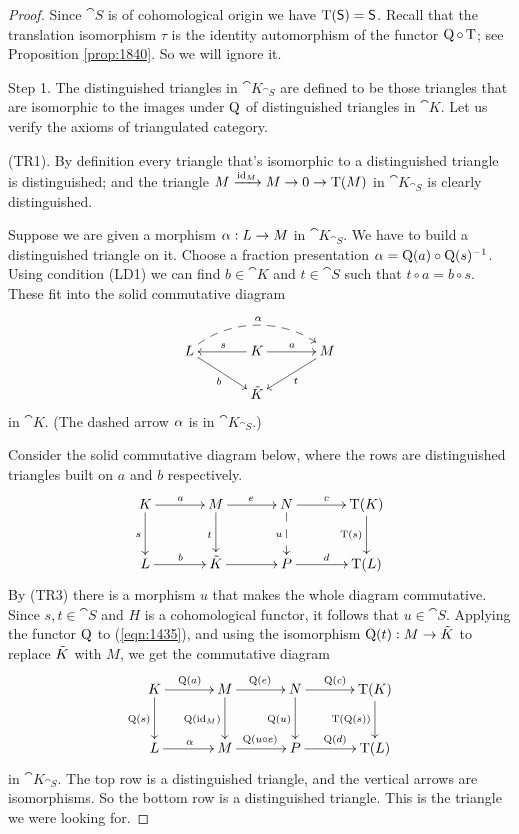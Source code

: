 \begin{proof} 
Since $\cat{S}$ is of cohomological origin we have 
$\operatorname{T}(\operatorname{\mathsf{S}}) = \operatorname{\mathsf{S}}$. Recall that the translation isomorphism $\tau$ is 
the identity automorphism of the functor $\operatorname{Q} \circ \operatorname{T}$; see 
Proposition \ref{prop:1840}. So we will ignore it. 

\medskip \noindent
Step 1.
The distinguished triangles in $\cat{K}_{\cat{S}}$ are defined to be those
triangles that are isomorphic to the images under $\operatorname{Q}$ of distinguished 
triangles in $\cat{K}$. Let us verify the axioms of triangulated 
category. 

\medskip \noindent
(TR1). By definition every triangle that's isomorphic to a distinguished 
triangle is distinguished; and the triangle 
$M \xrightarrow{\operatorname{id}_M} M \to 0 \to \operatorname{T}(M)$ 
in $\cat{K}_{\cat{S}}$ is clearly distinguished.

Suppose we are given a morphism $\alpha : L \to M$ in $\cat{K}_{\cat{S}}$. We have 
to build a distinguished triangle on it. 
Choose a fraction presentation 
$\alpha = \operatorname{Q}(a) \circ \operatorname{Q}(s)^{-1}$.
Using condition (LD1) we can find $b \in \cat{K}$ and $t \in 
\cat{S}$ such that $t \circ a = b \circ s$.
These fit into the solid commutative diagram
\[ \UseTips  \xymatrix @C=8ex @R=4ex { 
L
\ar@(ur,ul)@{-->}[rr]^{\al}
\ar[dr]_{b}
&
K
\ar[l]_{s}
\ar[r]^{a}
&
M
\ar[dl]^{t}
\\
&
\til{K}
}  \]
in $\cat{K}$. (The dashed arrow $\alpha$ is in $\cat{K}_{\cat{S}}$.) 

Consider the solid commutative diagram below, where
the rows are  distinguished triangles  built on $a$  and $b$ respectively.
\begin{equation} \label{eqn:1435}
 \UseTips  \xymatrix @C=8ex @R=6ex { 
K
\ar[r]^{a}
\ar[d]_{s}
&
M
\ar[r]^{e}
\ar[d]_{t}
& 
N
\ar[r]^{c}
\ar@{-->}[d]_{u}
&
\opn{T}(K)
\ar[d]_{\opn{T}(s)}
\\
L
\ar[r]^{b}
&
\til{K}
\ar[r]^{}
& 
P
\ar[r]^{d}
&
\opn{T}(L)
} 
\end{equation}
By (TR3) there is a morphism $u$ that makes the whole diagram commutative.
Since $s, t \in \cat{S}$ and $H$ is a cohomological functor, it follows that 
$u \in \cat{S}$. 
Applying the functor $\operatorname{Q}$ to (\ref{eqn:1435}), and using the 
isomorphism 
$\operatorname{Q}(t) : M \to \tilde{K}$ 
to replace $\tilde{K}$ with $M$,  we get the commutative diagram
\[ \UseTips  \xymatrix @C=8ex @R=6ex { 
K
\ar[r]^{\opn{Q}(a)}
\ar[d]_{\opn{Q}(s)}
&
M
\ar[r]^{\opn{Q}(e)}
\ar[d]_{\opn{Q}(\opn{id}_M)}
& 
N
\ar[r]^{\opn{Q}(c)}
\ar[d]_{\opn{Q}(u)}
&
\opn{T}(K)
\ar[d]_{\opn{T}(\opn{Q}(s))}
\\
L
\ar[r]^{\al}
&
M
\ar[r]^{\opn{Q}(u \circ e)}
& 
P
\ar[r]^{\opn{Q}(d)}
&
\opn{T}(L)
}  \]
in $\cat{K}_{\cat{S}}$. The top row is a distinguished triangle, and the
vertical arrows are isomorphisms. So the bottom row is a distinguished 
triangle. This is the triangle we were looking for. 


\end{proof}
